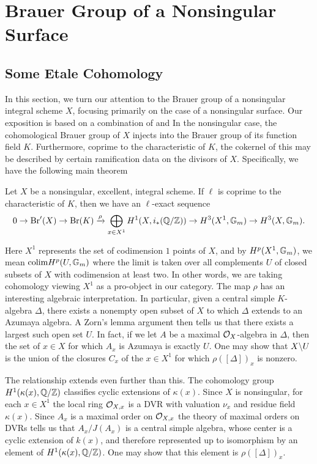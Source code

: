 
\section{Brauer Group of a Nonsingular Surface}
\subsection{Some Etale Cohomology}
In this section, we turn our attention to the Brauer group of a nonsingular integral scheme $X$, focusing primarily on the case of a nonsingular surface.  Our exposition is based on a combination of \cite{artin1972some} and \cite{Artin&deJong} In the nonsingular case, the cohomological Brauer group of $X$ injects into the Brauer group of its function field $K$.  Furthermore, coprime to the characteristic of $K$, the cokernel of this may be described by certain ramification data on the divisors of $X$.  Specifically, we have the following main theorem
\begin{thm}
Let $X$ be a nonsingular, excellent, integral scheme.  If $\ell$ is coprime to the characteristic of $K$, then we have an $\ell$-exact sequence
$$0\rightarrow \textnormal{Br}'(X)\rightarrow\textnormal{Br}(K)\xrightarrow{\rho} \bigoplus_{x\in X^1} H^1(X,i_*(\mathbb{Q}/\mathbb{Z}))\rightarrow H^3(X^1,\mathbb{G}_m)\rightarrow H^3(X,\mathbb{G}_m).$$
\end{thm}
Here $X^1$ represents the set of codimension $1$ points of $X$, and by $H^p(X^1,\mathbb{G}_m)$, we mean $\textnormal{colim} H^p(U,\mathbb{G}_m)$ where the limit is taken over all complements $U$ of closed subsets of $X$ with codimension at least two.  In other words, we are taking cohomology viewing $X^1$ as a pro-object in our category.  The map $\rho$ has an interesting algebraic interpretation.  In particular, given a central simple $K$-algebra $\Delta$, there exists a nonempty open subset of $X$ to which $\Delta$ extends to an Azumaya algebra.  A Zorn's lemma argument then tells us that there exists a largest such open set $U$.  In fact, if we let $A$ be a maximal $\mathcal{O}_X$-algebra in $\Delta$, then the set of $x\in X$ for which $A_x$ is Azumaya is exactly $U$.  One may show that $X\backslash U$ is the union of the closures $C_x$ of the $x\in X^1$ for which $\rho([\Delta])_x$ is nonzero.

The relationship extends even further than this.  The cohomology group $H^1(\kappa(x),\mathbb{Q}/\mathbb{Z})$ classifies cyclic extensions of $\kappa(x)$.  Since $X$ is nonsingular, for each $x\in X^1$ the local ring $\mathcal{O}_{X,x}$ is a DVR with valuation $\nu_x$ and residue field $\kappa(x)$.  Since $A_x$ is a maximal order on $\mathcal{O}_{X,x}$ the theory of maximal orders on DVRs tells us that $A_x/J(A_x)$ is a central simple algebra, whose center is a cyclic extension of $k(x)$, and therefore represented up to isomorphism by an element of $H^1(\kappa(x),\mathbb{Q}/\mathbb{Z})$.  One may show that this element is $\rho([\Delta])_x$.

